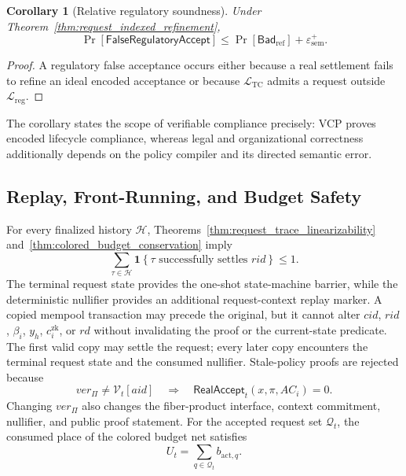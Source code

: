 \documentclass[10pt,journal,compsoc]{IEEEtran}
\newtheorem{corollary}{Corollary}
\begin{document}
\begin{corollary}[Relative regulatory soundness]
\label{cor:relative_regulatory_soundness}
Under Theorem~\ref{thm:request_indexed_refinement},
\begin{equation}
\Pr[\mathsf{FalseRegulatoryAccept}]
\leq\Pr[\mathsf{Bad}_{\mathrm{ref}}]
+\varepsilon_{\mathrm{sem}}^{+}.
\label{eq:relative_regulatory_soundness_bound}
\end{equation}
\end{corollary}

\begin{proof}
A regulatory false acceptance occurs either because a real settlement fails to refine an ideal encoded acceptance or because $\mathcal{L}_{\mathrm{TC}}$ admits a request outside $\mathcal{L}_{\mathrm{reg}}$.
\end{proof}

The corollary states the scope of verifiable compliance precisely: VCP proves encoded lifecycle compliance, whereas legal and organizational correctness additionally depends on the policy compiler and its directed semantic error.

\subsection{Replay, Front-Running, and Budget Safety}
\label{subsec:security_budget}

For every finalized history $\mathcal{H}$, Theorems~\ref{thm:request_trace_linearizability} and~\ref{thm:colored_budget_conservation} imply
\begin{equation}
\sum_{\tau\in\mathcal{H}}
\mathbf{1}
\left\{
\tau\text{ successfully settles }rid
\right\}
\leq 1.
\label{eq:single_settlement_bound}
\end{equation}
The terminal request state provides the one-shot state-machine barrier, while the deterministic nullifier provides an additional request-context replay marker. A copied mempool transaction may precede the original, but it cannot alter $cid$, $rid$, $\beta_i$, $y_h$, $c_i^{\mathrm{zk}}$, or $rd$ without invalidating the proof or the current-state predicate. The first valid copy may settle the request; every later copy encounters the terminal request state and the consumed nullifier. Stale-policy proofs are rejected because
\begin{equation}
ver_{\Pi}\neq\mathcal{V}_t[aid]
\quad\Longrightarrow\quad
\mathsf{RealAccept}_t(x,\pi,AC_i)=0.
\label{eq:stale_policy_rejection_security}
\end{equation}
Changing $ver_{\Pi}$ also changes the fiber-product interface, context commitment, nullifier, and public proof statement. For the accepted request set $\mathcal{Q}_t$, the consumed place of the colored budget net satisfies
\begin{equation}
U_t = \sum_{q\in\mathcal{Q}_t} b_{\mathrm{act},q}.
\label{eq:consumed_budget_sum}
\end{equation}
\end{document}
